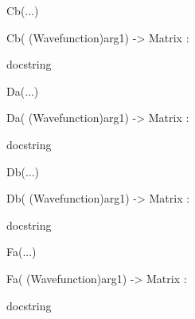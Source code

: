 \documentclass[letterpaper,10pt,english]{sphinxmanual}
\begin{document}
\begin{description}
\begin{description}
\begin{DUlineblock}{0em}
\begin{DUlineblock}{\DUlineblockindent}
\begin{DUlineblock}{\DUlineblockindent}
\item[] 
\end{DUlineblock}
\end{DUlineblock}
\item[] Cb(...)
\item[]
\begin{DUlineblock}{\DUlineblockindent}
\item[] Cb( (Wavefunction)arg1) -\textgreater{} Matrix :
\item[]
\begin{DUlineblock}{\DUlineblockindent}
\item[] docstring
\item[] 
\end{DUlineblock}
\end{DUlineblock}
\item[] Da(...)
\item[]
\begin{DUlineblock}{\DUlineblockindent}
\item[] Da( (Wavefunction)arg1) -\textgreater{} Matrix :
\item[]
\begin{DUlineblock}{\DUlineblockindent}
\item[] docstring
\item[] 
\end{DUlineblock}
\end{DUlineblock}
\item[] Db(...)
\item[]
\begin{DUlineblock}{\DUlineblockindent}
\item[] Db( (Wavefunction)arg1) -\textgreater{} Matrix :
\item[]
\begin{DUlineblock}{\DUlineblockindent}
\item[] docstring
\item[] 
\end{DUlineblock}
\end{DUlineblock}
\item[] Fa(...)
\item[]
\begin{DUlineblock}{\DUlineblockindent}
\item[] Fa( (Wavefunction)arg1) -\textgreater{} Matrix :
\item[]
\begin{DUlineblock}{\DUlineblockindent}
\item[] docstring
\item[] 
\end{DUlineblock}

\end{DUlineblock}
\end{DUlineblock}
\end{description}
\end{description}
\end{document}
